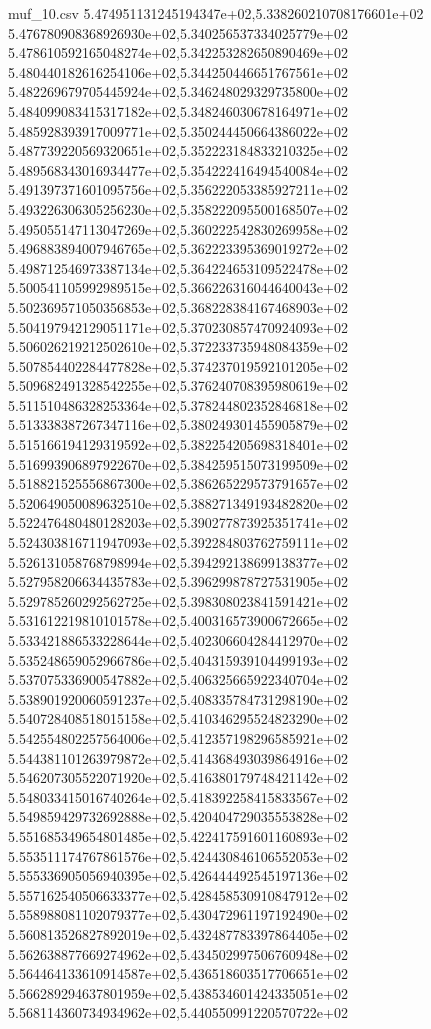 \begin{filecontents*}{muf_10.csv}
5.474951131245194347e+02,5.338260210708176601e+02
5.476780908368926930e+02,5.340256537334025779e+02
5.478610592165048274e+02,5.342253282650890469e+02
5.480440182616254106e+02,5.344250446651767561e+02
5.482269679705445924e+02,5.346248029329735800e+02
5.484099083415317182e+02,5.348246030678164971e+02
5.485928393917009771e+02,5.350244450664386022e+02
5.487739220569320651e+02,5.352223184833210325e+02
5.489568343016934477e+02,5.354222416494540084e+02
5.491397371601095756e+02,5.356222053385927211e+02
5.493226306305256230e+02,5.358222095500168507e+02
5.495055147113047269e+02,5.360222542830269958e+02
5.496883894007946765e+02,5.362223395369019272e+02
5.498712546973387134e+02,5.364224653109522478e+02
5.500541105992989515e+02,5.366226316044640043e+02
5.502369571050356853e+02,5.368228384167468903e+02
5.504197942129051171e+02,5.370230857470924093e+02
5.506026219212502610e+02,5.372233735948084359e+02
5.507854402284477828e+02,5.374237019592101205e+02
5.509682491328542255e+02,5.376240708395980619e+02
5.511510486328253364e+02,5.378244802352846818e+02
5.513338387267347116e+02,5.380249301455905879e+02
5.515166194129319592e+02,5.382254205698318401e+02
5.516993906897922670e+02,5.384259515073199509e+02
5.518821525556867300e+02,5.386265229573791657e+02
5.520649050089632510e+02,5.388271349193482820e+02
5.522476480480128203e+02,5.390277873925351741e+02
5.524303816711947093e+02,5.392284803762759111e+02
5.526131058768798994e+02,5.394292138699138377e+02
5.527958206634435783e+02,5.396299878727531905e+02
5.529785260292562725e+02,5.398308023841591421e+02
5.531612219810101578e+02,5.400316573900672665e+02
5.533421886533228644e+02,5.402306604284412970e+02
5.535248659052966786e+02,5.404315939104499193e+02
5.537075336900547882e+02,5.406325665922340704e+02
5.538901920060591237e+02,5.408335784731298190e+02
5.540728408518015158e+02,5.410346295524823290e+02
5.542554802257564006e+02,5.412357198296585921e+02
5.544381101263979872e+02,5.414368493039864916e+02
5.546207305522071920e+02,5.416380179748421142e+02
5.548033415016740264e+02,5.418392258415833567e+02
5.549859429732692888e+02,5.420404729035553828e+02
5.551685349654801485e+02,5.422417591601160893e+02
5.553511174767861576e+02,5.424430846106552053e+02
5.555336905056940395e+02,5.426444492545197136e+02
5.557162540506633377e+02,5.428458530910847912e+02
5.558988081102079377e+02,5.430472961197192490e+02
5.560813526827892019e+02,5.432487783397864405e+02
5.562638877669274962e+02,5.434502997506760948e+02
5.564464133610914587e+02,5.436518603517706651e+02
5.566289294637801959e+02,5.438534601424335051e+02
5.568114360734934962e+02,5.440550991220570722e+02

\end{filecontents*}
